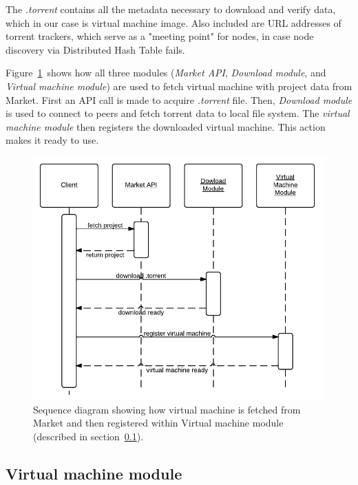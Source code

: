 The \emph{.torrent} contains all the metadata necessary to download and verify data, which in our case is virtual machine image. Also included are URL addresses of torrent trackers, which serve as a "meeting point" for nodes, in case node discovery via Distributed Hash Table fails.

Figure~\ref{f:clientprojdownload}~shows how all three modules (\emph{Market API}, \emph{Download module}, and \emph{Virtual machine module}) are used to fetch virtual machine with project data from Market. First an API call is made to acquire \emph{.torrent} file. Then, \emph{Download module} is used to connect to peers and fetch torrent data to local file system. The \emph{virtual machine module} then registers the downloaded virtual machine. This action makes it ready to use.

\begin{figure}
\centering
\includegraphics{diagrams/ClientProjectDownload.pdf}
\caption{Sequence diagram showing how virtual machine is fetched from Market and then registered within Virtual machine module (described in section~\ref{s:c_vm_mod}).}
\label{f:clientprojdownload}
\end{figure}

\subsection{Virtual machine module}

\label{s:c_vm_mod}

